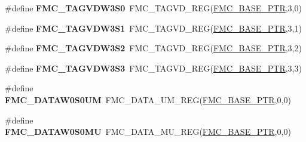 \begin{DoxyCompactItemize}
\item 
\hypertarget{group___f_m_c___register___accessor___macros_gac8d280735ba899667641673164a497b0}{}\#define {\bfseries F\+M\+C\+\_\+\+T\+A\+G\+V\+D\+W3\+S0}~F\+M\+C\+\_\+\+T\+A\+G\+V\+D\+\_\+\+R\+E\+G(\hyperlink{group___f_m_c___peripheral_ga0a740437b573e32e6b932bf729485fd9}{F\+M\+C\+\_\+\+B\+A\+S\+E\+\_\+\+P\+T\+R},3,0)\label{group___f_m_c___register___accessor___macros_gac8d280735ba899667641673164a497b0}

\item 
\hypertarget{group___f_m_c___register___accessor___macros_gacb51da652a95878391603e6bd6bd9e7e}{}\#define {\bfseries F\+M\+C\+\_\+\+T\+A\+G\+V\+D\+W3\+S1}~F\+M\+C\+\_\+\+T\+A\+G\+V\+D\+\_\+\+R\+E\+G(\hyperlink{group___f_m_c___peripheral_ga0a740437b573e32e6b932bf729485fd9}{F\+M\+C\+\_\+\+B\+A\+S\+E\+\_\+\+P\+T\+R},3,1)\label{group___f_m_c___register___accessor___macros_gacb51da652a95878391603e6bd6bd9e7e}

\item 
\hypertarget{group___f_m_c___register___accessor___macros_gaa5f425b5b278d208a94361d641f31c64}{}\#define {\bfseries F\+M\+C\+\_\+\+T\+A\+G\+V\+D\+W3\+S2}~F\+M\+C\+\_\+\+T\+A\+G\+V\+D\+\_\+\+R\+E\+G(\hyperlink{group___f_m_c___peripheral_ga0a740437b573e32e6b932bf729485fd9}{F\+M\+C\+\_\+\+B\+A\+S\+E\+\_\+\+P\+T\+R},3,2)\label{group___f_m_c___register___accessor___macros_gaa5f425b5b278d208a94361d641f31c64}

\item 
\hypertarget{group___f_m_c___register___accessor___macros_ga694fa8a9ba73fb6acdc4648f20beaaa3}{}\#define {\bfseries F\+M\+C\+\_\+\+T\+A\+G\+V\+D\+W3\+S3}~F\+M\+C\+\_\+\+T\+A\+G\+V\+D\+\_\+\+R\+E\+G(\hyperlink{group___f_m_c___peripheral_ga0a740437b573e32e6b932bf729485fd9}{F\+M\+C\+\_\+\+B\+A\+S\+E\+\_\+\+P\+T\+R},3,3)\label{group___f_m_c___register___accessor___macros_ga694fa8a9ba73fb6acdc4648f20beaaa3}

\item 
\hypertarget{group___f_m_c___register___accessor___macros_ga907e9235fdce3646eac668ce6de99a57}{}\#define {\bfseries F\+M\+C\+\_\+\+D\+A\+T\+A\+W0\+S0\+U\+M}~F\+M\+C\+\_\+\+D\+A\+T\+A\+\_\+\+U\+M\+\_\+\+R\+E\+G(\hyperlink{group___f_m_c___peripheral_ga0a740437b573e32e6b932bf729485fd9}{F\+M\+C\+\_\+\+B\+A\+S\+E\+\_\+\+P\+T\+R},0,0)\label{group___f_m_c___register___accessor___macros_ga907e9235fdce3646eac668ce6de99a57}

\item 
\hypertarget{group___f_m_c___register___accessor___macros_ga31885aeb3b1fe3d44794bd089145cc2a}{}\#define {\bfseries F\+M\+C\+\_\+\+D\+A\+T\+A\+W0\+S0\+M\+U}~F\+M\+C\+\_\+\+D\+A\+T\+A\+\_\+\+M\+U\+\_\+\+R\+E\+G(\hyperlink{group___f_m_c___peripheral_ga0a740437b573e32e6b932bf729485fd9}{F\+M\+C\+\_\+\+B\+A\+S\+E\+\_\+\+P\+T\+R},0,0)\label{group___f_m_c___register___accessor___macros_ga31885aeb3b1fe3d44794bd089145cc2a}


\end{DoxyCompactItemize}

